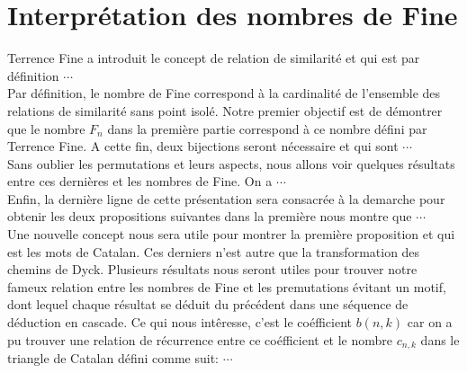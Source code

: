 \documentclass{report}
\begin{document}
    \section*{Interprétation des nombres de Fine}
    Terrence Fine a introduit le concept de relation de similarité et qui est par définition $\cdots$\\
    Par définition, le nombre de Fine correspond à la cardinalité de l'ensemble des relations de similarité sans point isolé. Notre premier objectif est de démontrer que le nombre $F_{n}$ dans la première partie correspond à ce nombre défini par Terrence Fine. A cette fin, deux bijections seront nécessaire et qui sont $\cdots$\vspace{7pt}\\
    Sans oublier les permutations et leurs aspects, nous allons voir quelques résultats entre ces dernières et les nombres de Fine. On a $\cdots$\vspace{7pt}\\
    Enfin, la dernière ligne de cette présentation sera consacrée à la demarche pour obtenir les deux propositions suivantes dans la première nous montre que $\cdots$\\
    Une nouvelle concept nous sera utile pour montrer la première proposition et qui est les mots de Catalan. Ces derniers n'est autre que la transformation des chemins de Dyck. Plusieurs résultats nous seront utiles pour trouver notre fameux relation entre les nombres de Fine et les premutations évitant un motif, dont lequel chaque résultat se déduit du précédent dans une séquence de déduction en cascade. Ce qui nous intêresse, c'est le coéfficient $b(n, k)$ car on a pu trouver une relation de récurrence entre ce coéfficient et le nombre $c_{n, k}$ dans le triangle de Catalan défini comme suit: $\cdots$
\end{document}
